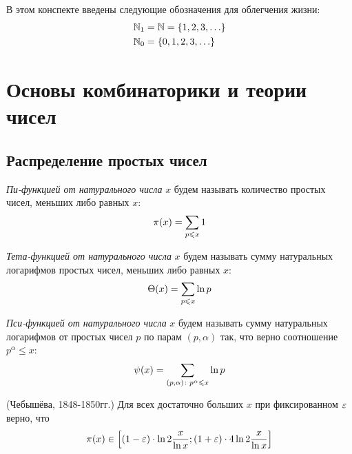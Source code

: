 \begin{anote}
	В этом конспекте введены следующие обозначения для облегчения жизни:
	\begin{align*}
		&{\mathbb{N}_1 = \mathbb{N} = \{1, 2, 3, \ldots\}}
		\\
		&{\mathbb{N}_0 = \{0, 1, 2, 3, \ldots\}}
	\end{align*}
\end{anote}

\section{Основы комбинаторики и теории чисел}
\subsection{Распределение простых чисел}

\begin{definition}
	\textit{Пи-функцией от натурального числа } $x$ будем называть количество простых чисел, меньших либо равных $x$:
	\[
		\pi(x) = \sum\limits_{p \leqslant x} 1
	\]
\end{definition}

\begin{definition}
	\textit{Тета-функцией от натурального числа} $x$ будем называть сумму натуральных логарифмов простых чисел, меньших либо равных $x$:
	\[
		\Theta(x) = \sum\limits_{p \leqslant x} \ln p
	\]
\end{definition}

\begin{definition}
	\textit{Пси-функцией от натурального числа} $x$ будем называть сумму натуральных логарифмов от простых чисел $p$ по парам $(p, \alpha)$ так, что верно соотношение $p^\alpha \le x$:
	\[
		\psi(x) = \sum\limits_{(p, \alpha) \colon p^\alpha \leqslant x} \ln p
	\]
\end{definition}

\begin{theorem} (Чебышёва, 1848-1850гг.)
	Для всех достаточно больших $x$ при фиксированном $\varepsilon$ верно, что
	\[
		\pi(x) \in \left[(1 - \varepsilon) \cdot \ln 2 \frac{x}{\ln x}; (1 + \varepsilon) \cdot 4\ln 2 \frac{x}{\ln x}\right]
	\]
\end{theorem}

